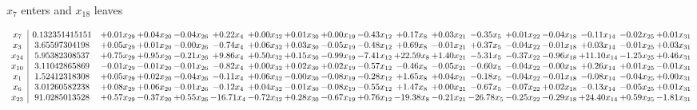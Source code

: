 \documentclass[9pt]{article}
\begin{document}
 $ x_{7} $ enters and $ x_{18} $ leaves 

 \[\begin{array}{c| c c@{\hskip 2pt} c@{\hskip 2pt} c@{\hskip 2pt} c@{\hskip 2pt} c@{\hskip 2pt} c@{\hskip 2pt} c@{\hskip 2pt} c@{\hskip 2pt} c@{\hskip 2pt} c@{\hskip 2pt} c@{\hskip 2pt} c@{\hskip 2pt} c@{\hskip 2pt} c@{\hskip 2pt} c@{\hskip 2pt} c@{\hskip 2pt} }
 x_{7}   &  0.132351415151 & +  0.01 x_{29} & +  0.04 x_{20} & -0.04 x_{26} & +  0.22 x_{4} & +  0.00 x_{32} & +  0.01 x_{30} & +  0.00 x_{19} & -0.43 x_{12} & +  0.17 x_{8} & +  0.03 x_{21} & -0.35 x_{5} & +  0.01 x_{22} & -0.04 x_{18} & -0.11 x_{14} & -0.02 x_{25} & +  0.01 x_{31}\\
 x_{3}   &  3.65597304198 & +  0.05 x_{29} & +  0.01 x_{20} & -0.00 x_{26} & -0.74 x_{4} & +  0.06 x_{32} & +  0.03 x_{30} & -0.05 x_{19} & -0.48 x_{12} & +  0.69 x_{8} & -0.01 x_{21} & +  0.37 x_{5} & -0.04 x_{22} & -0.01 x_{18} & +  0.03 x_{14} & -0.01 x_{25} & +  0.03 x_{31}\\
 x_{24}   &  5.95382308537 & +  0.75 x_{29} & +  0.95 x_{20} & -0.21 x_{26} & +  9.86 x_{4} & +  0.50 x_{32} & +  0.15 x_{30} & -0.99 x_{19} & -7.41 x_{12} & + 22.59 x_{8} & +  1.40 x_{21} & -5.31 x_{5} & -0.37 x_{22} & -0.96 x_{18} & + 11.10 x_{14} & -1.25 x_{25} & +  0.46 x_{31}\\
 x_{10}   &  3.11042865869 & -0.01 x_{29} & -0.01 x_{20} & -0.01 x_{26} & -0.82 x_{4} & +  0.00 x_{32} & +  0.02 x_{30} & +  0.02 x_{19} & -0.57 x_{12} & -0.46 x_{8} & -0.05 x_{21} & -0.60 x_{5} & -0.04 x_{22} & -0.00 x_{18} & +  0.26 x_{14} & +  0.01 x_{25} & -0.01 x_{31}\\
 x_{1}   &  1.52412318308 & +  0.05 x_{29} & +  0.02 x_{20} & -0.04 x_{26} & -0.11 x_{4} & +  0.06 x_{32} & -0.00 x_{30} & -0.08 x_{19} & -0.28 x_{12} & +  1.65 x_{8} & +  0.04 x_{21} & -0.18 x_{5} & -0.04 x_{22} & -0.01 x_{18} & -0.08 x_{14} & -0.04 x_{25} & +  0.00 x_{31}\\
 x_{6}   &  3.01260582238 & +  0.08 x_{29} & +  0.06 x_{20} & -0.01 x_{26} & -0.12 x_{4} & +  0.04 x_{32} & -0.01 x_{30} & -0.08 x_{19} & -0.55 x_{12} & +  1.47 x_{8} & +  0.00 x_{21} & -0.67 x_{5} & -0.07 x_{22} & +  0.02 x_{18} & -0.13 x_{14} & -0.05 x_{25} & +  0.01 x_{31}\\
 x_{23}   &  91.0285013528 & +  0.57 x_{29} & -0.37 x_{20} & +  0.55 x_{26} & -16.71 x_{4} & -0.72 x_{32} & +  0.28 x_{30} & -0.67 x_{19} & +  0.76 x_{12} & -19.38 x_{8} & -0.21 x_{21} & -26.78 x_{5} & -0.25 x_{22} & -0.29 x_{18} & + 24.40 x_{14} & +  0.59 x_{25} & -1.81 x_{31}\\

\end{array}\]
\end{document}
